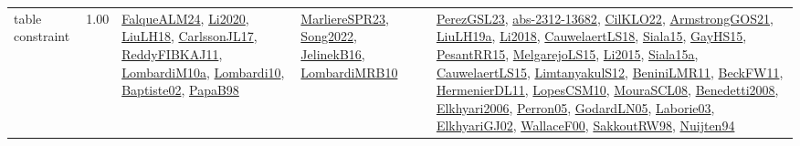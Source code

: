 {\begin{longtable}{p{3cm}r>{\raggedright\arraybackslash}p{6cm}>{\raggedright\arraybackslash}p{6cm}>{\raggedright\arraybackslash}p{8cm}}
\index{table constraint}\index{Constraints!table constraint}table constraint &  1.00 & \hyperref[detail:FalqueALM24]{FalqueALM24}, \hyperref[detail:Li2020]{Li2020}, \hyperref[detail:LiuLH18]{LiuLH18}, \hyperref[detail:CarlssonJL17]{CarlssonJL17}, \hyperref[detail:ReddyFIBKAJ11]{ReddyFIBKAJ11}, \hyperref[detail:LombardiM10a]{LombardiM10a}, \hyperref[detail:Lombardi10]{Lombardi10}, \hyperref[detail:Baptiste02]{Baptiste02}, \hyperref[detail:PapaB98]{PapaB98} & \hyperref[detail:MarliereSPR23]{MarliereSPR23}, \hyperref[detail:Song2022]{Song2022}, \hyperref[detail:JelinekB16]{JelinekB16}, \hyperref[detail:LombardiMRB10]{LombardiMRB10} & \hyperref[detail:PerezGSL23]{PerezGSL23}, \hyperref[detail:abs-2312-13682]{abs-2312-13682}, \hyperref[detail:CilKLO22]{CilKLO22}, \hyperref[detail:ArmstrongGOS21]{ArmstrongGOS21}, \hyperref[detail:LiuLH19a]{LiuLH19a}, \hyperref[detail:Li2018]{Li2018}, \hyperref[detail:CauwelaertLS18]{CauwelaertLS18}, \hyperref[detail:Siala15]{Siala15}, \hyperref[detail:GayHS15]{GayHS15}, \hyperref[detail:PesantRR15]{PesantRR15}, \hyperref[detail:MelgarejoLS15]{MelgarejoLS15}, \hyperref[detail:Li2015]{Li2015}, \hyperref[detail:Siala15a]{Siala15a}, \hyperref[detail:CauwelaertLS15]{CauwelaertLS15}, \hyperref[detail:LimtanyakulS12]{LimtanyakulS12}, \hyperref[detail:BeniniLMR11]{BeniniLMR11}, \hyperref[detail:BeckFW11]{BeckFW11}, \hyperref[detail:HermenierDL11]{HermenierDL11}, \hyperref[detail:LopesCSM10]{LopesCSM10}, \hyperref[detail:MouraSCL08]{MouraSCL08}, \hyperref[detail:Benedetti2008]{Benedetti2008}, \hyperref[detail:Elkhyari2006]{Elkhyari2006}, \hyperref[detail:Perron05]{Perron05}, \hyperref[detail:GodardLN05]{GodardLN05}, \hyperref[detail:Laborie03]{Laborie03}, \hyperref[detail:ElkhyariGJ02]{ElkhyariGJ02}, \hyperref[detail:WallaceF00]{WallaceF00}, \hyperref[detail:SakkoutRW98]{SakkoutRW98}, \hyperref[detail:Nuijten94]{Nuijten94}\\
\end{longtable}
}

\clearpage
